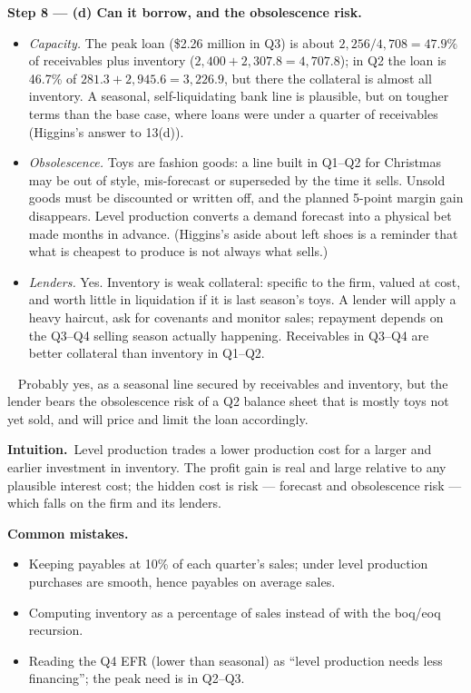 \documentclass[11pt,a4paper]{article}
\newcommand{\step}[2]{\par\medskip\noindent\textbf{Step #1 --- #2.}~}
\newcommand{\intuition}{\par\medskip\noindent\textbf{Intuition.}~}
\newcommand{\answer}[1]{\par\smallskip\noindent\fbox{\textbf{Answer #1.}}~}
\newcommand{\pitfalls}{\par\medskip\noindent\textbf{Common mistakes.}}
\begin{document}
\step{8}{(d) Can it borrow, and the obsolescence risk}
\begin{itemize}
  \item \emph{Capacity.} The peak loan (\$2.26 million in Q3) is about $2{,}256/4{,}708 = 47.9\%$
        of receivables plus inventory ($2{,}400 + 2{,}307.8 = 4{,}707.8$); in Q2 the loan is 46.7\% of
        $281.3 + 2{,}945.6 = 3{,}226.9$, but there the collateral is almost all inventory. A
        seasonal, self-liquidating bank line is plausible, but on tougher terms than the base case,
        where loans were under a quarter of receivables (Higgins's answer to 13(d)).
  \item \emph{Obsolescence.} Toys are fashion goods: a line built in Q1--Q2 for Christmas may be
        out of style, mis-forecast or superseded by the time it sells. Unsold goods must be
        discounted or written off, and the planned 5-point margin gain disappears. Level production
        converts a demand forecast into a physical bet made months in advance. (Higgins's aside
        about left shoes is a reminder that what is cheapest to produce is not always what sells.)
  \item \emph{Lenders.} Yes. Inventory is weak collateral: specific to the firm, valued at cost,
        and worth little in liquidation if it is last season's toys. A lender will apply a heavy
        haircut, ask for covenants and monitor sales; repayment depends on the Q3--Q4 selling
        season actually happening. Receivables in Q3--Q4 are better collateral than inventory in
        Q1--Q2.
\end{itemize}

\answer{(d)} Probably yes, as a seasonal line secured by receivables and inventory, but the lender
bears the obsolescence risk of a Q2 balance sheet that is mostly toys not yet sold, and will price
and limit the loan accordingly.

\intuition Level production trades a lower production cost for a larger and earlier investment in
inventory. The profit gain is real and large relative to any plausible interest cost; the hidden
cost is risk --- forecast and obsolescence risk --- which falls on the firm and its lenders.

\pitfalls
\begin{itemize}
  \item Keeping payables at 10\% of each quarter's sales; under level production purchases are
        smooth, hence payables on average sales.
  \item Computing inventory as a percentage of sales instead of with the boq/eoq recursion.
  \item Reading the Q4 EFR (lower than seasonal) as ``level production needs less financing''; the
        peak need is in Q2--Q3.
\end{itemize}
\end{document}
